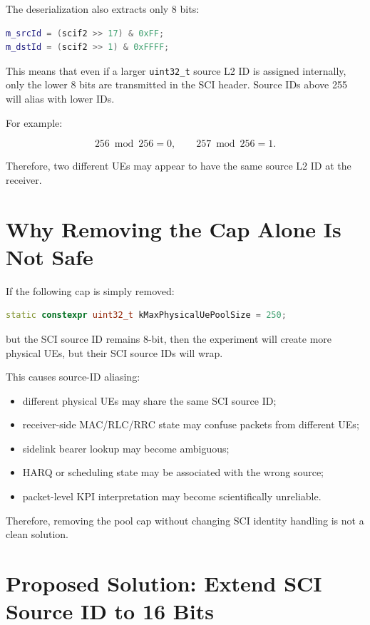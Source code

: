 \documentclass[11pt]{article}
\begin{document}
The deserialization also extracts only 8 bits:

\begin{lstlisting}[language=C++]
m_srcId = (scif2 >> 17) & 0xFF;
m_dstId = (scif2 >> 1) & 0xFFFF;
\end{lstlisting}

This means that even if a larger \texttt{uint32\_t} source L2 ID is assigned internally, only the lower 8 bits are transmitted in the SCI header. Source IDs above 255 will alias with lower IDs.

For example:

\[
256 \bmod 256 = 0,
\qquad
257 \bmod 256 = 1.
\]

Therefore, two different UEs may appear to have the same source L2 ID at the receiver.

\section{Why Removing the Cap Alone Is Not Safe}

If the following cap is simply removed:

\begin{lstlisting}[language=C++]
static constexpr uint32_t kMaxPhysicalUePoolSize = 250;
\end{lstlisting}

but the SCI source ID remains 8-bit, then the experiment will create more physical UEs, but their SCI source IDs will wrap.

This causes source-ID aliasing:

\begin{itemize}
    \item different physical UEs may share the same SCI source ID;
    \item receiver-side MAC/RLC/RRC state may confuse packets from different UEs;
    \item sidelink bearer lookup may become ambiguous;
    \item HARQ or scheduling state may be associated with the wrong source;
    \item packet-level KPI interpretation may become scientifically unreliable.
\end{itemize}

Therefore, removing the pool cap without changing SCI identity handling is not a clean solution.

\section{Proposed Solution: Extend SCI Source ID to 16 Bits}
\end{document}
